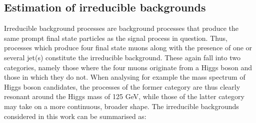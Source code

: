 \subsection{Estimation of irreducible backgrounds}
\label{sec:IrreducibleBackgrounds}
Irreducible background processes are background processes that produce the same prompt final state particles as the signal process in question. Thus, processes which produce four final state muons along with the presence of one or several jet(s) constitute the irreducible background. These again fall into two categories, namely those where the four muons originate from a Higgs boson and those in which they do not. When analysing for example the mass spectrum of Higgs boson candidates, the processes of the former category are thus clearly resonant around the Higgs mass of 125 GeV, while those of the latter category may take on a more continuous, broader shape. The irreducible backgrounds considered in this work can be summarised as:\\
